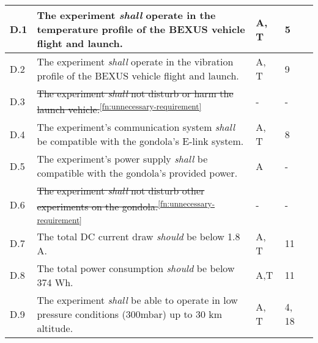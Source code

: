 \begin{longtable}[]{|m{}| m{} |m{} |m{}|m{}|}
D.1  & The experiment \textit{shall} operate in the temperature profile of the BEXUS vehicle flight and launch.                                                                         &       A, T       & 5            &        \\ \hline
D.2  & The experiment \textit{shall} operate in the vibration profile of the BEXUS vehicle flight and launch.                                                                           &       A, T       & 9            &        \\ \hline
D.3  & \st{The experiment \textit{shall} not disturb or harm the launch vehicle.}\textsuperscript{\ref{fn:unnecessary-requirement}}                                                                                                             &      -      & -          &        \\ \hline
D.4  & The experiment's communication system \textit{shall} be compatible with the gondola's E-link system.                                                                             &      A, T        & 8            &        \\ \hline
D.5  & The experiment's power supply \textit{shall
} be compatible with the gondola's provided power.                                                                                    &      A        &  -           &        \\ \hline
D.6  & \st{The experiment \textit{shall} not disturb other experiments on the gondola.}\textsuperscript{\ref{fn:unnecessary-requirement}}                                                                                                       &      -      & -           &        \\ \hline
D.7  & The total DC current draw \textit{should} be below 1.8 A.                                                                                                                        &      A, T        & 11            &        \\ \hline
D.8  & The total power consumption \textit{should} be below 374 Wh.                                                                                                                      &       A,T       & 11            &        \\ \hline
D.9  & The experiment \textit{shall} be able to operate in low pressure conditions (300mbar) up to 30 km altitude.                                                                                       &      A, T        &  4, 18           &        \\ \hline

\end{longtable}
